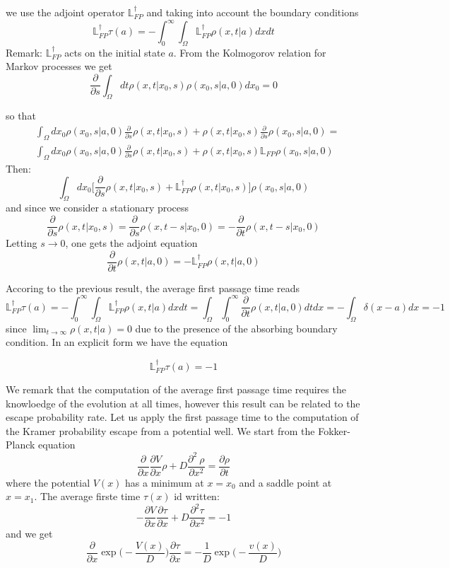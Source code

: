 we use the adjoint operator $\mathbb{L}_{FP}^{\dagger}$ and taking into account the boundary conditions 
$$
\mathbb{L}_{FP}^{\dagger} \tau(a) = -\int_{0}^{\infty}\int_{\Omega} \mathbb{L}_{FP}^{\dagger} \rho(x,t|a)dx dt
$$
Remark: $\mathbb{L}_{FP}^{\dagger}$ acts on the initial state $a$. From the Kolmogorov relation for Markov processes we get 
$$
\frac{\partial}{\partial s} \int_{\Omega} dt \rho(x,t|x_0,s)\rho(x_0,s|a,0)dx_0 = 0
$$

so that 
\begin{equation}
\begin{split}
& \int_{\Omega} dx_0 \rho(x_0,s|a,0)\frac{\partial}{\partial s} \rho(x,t|x_0,s) + 
\rho(x,t|x_0,s) \frac{\partial}{\partial s} \rho(x_0,s|a,0)
  = \\ 
& \int_{\Omega} dx_0 \rho(x_0,s|a,0)  \frac{\partial}{\partial s} \rho(x,t|x_0,s) + 
 \rho(x,t|x_0,s) \mathbb{L}_{FP} \rho(x_0,s|a,0)
\end{split}
\end{equation}
Then:
$$
\int_{\Omega} dx_0 \biggl[ \frac{\partial}{\partial s} \rho(x,t|x_0,s) + \mathbb{L}_{FP}^{\dagger} \rho (x,t|x_0,s) \biggr] \rho(x_0,s|a,0) 
$$
and since we consider a stationary process 
$$
\frac{\partial}{\partial s} \rho(x,t|x_0,s) = \frac{\partial}{\partial s} \rho (x,t -s|x_0,0) = - \frac{\partial}{\partial t} \rho(x,t-s|x_0,0)
$$
Letting $s \to 0$, one gets the adjoint equation
$$
\frac{\partial}{\partial t } \rho(x,t|a,0) = - \mathbb{L}_{FP}^{\dagger} \rho(x,t|a,0)
$$

Accoring to the previous result, the average first passage time reads
$$
\mathbb{L}_{FP}^{\dagger} \tau(a) = - \int_{0}^{\infty} \int_{\Omega} \mathbb{L}_{FP}^{\dagger} \rho(x,t|a)dx dt = \int_{\Omega}\int_{0}^{\infty} \frac{\partial}{\partial t} \rho(x,t|a,0)dt dx = - \int _{\Omega} \delta (x-a ) dx = -1
$$
 since $\lim_{t \to \infty} \rho(x,t|a) = 0 $ due to the presence of the absorbing boundary condition.
In an explicit form we have the equation 

\begin{equation}
\mathbb{L}_{FP}^{\dagger} \tau(a) = -1
\end{equation}

We remark that the computation of the average first passage time requires the knowloedge of the evolution at all times, however this result can be related to the escape probability rate. Let us apply the first passage time to the computation of the Kramer probability escape from a potential well.
We start from the Fokker-Planck equation 
$$
\frac{\partial}{\partial x} \frac{\partial V}{\partial x} \rho + D \frac{\partial ^2 \
\rho }{\partial x^2} = \frac{\partial 
\rho }{ \partial t}
$$
where the potential $V(x)$ has a minimum at $x = x_0$ and a saddle point at $x = x_1$.
The average firste time $\tau(x)$ id written:
$$
-\frac{\partial V}{\partial x}\frac{\partial \tau}{\partial x} + D \frac{\partial ^2 \tau}{\partial x^2} = -1
$$
and we get 
$$
\frac{\partial}{\partial x} \exp \biggl(-\frac{V(x)}{D}\biggr) \frac{\partial \tau}{\partial x} = - \frac{1}{D} \exp \biggl( - \frac{v(x)}{D}\biggr)
$$

